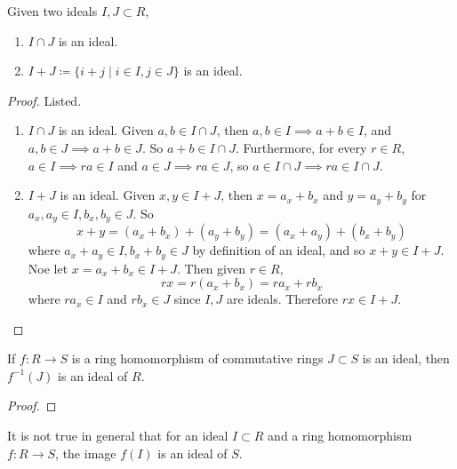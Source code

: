   \begin{theorem} 
    \label{thm:sum_int_ideals}
    Given two ideals $I, J \subset R$, 
    \begin{enumerate}
      \item $I \cap J$ is an ideal. 
      \item $I + J \coloneqq \{i + j \mid i \in I, j \in J\}$ is an ideal. 
    \end{enumerate}
  \end{theorem}
  \begin{proof}
    Listed. 
    \begin{enumerate}
      \item $I \cap J$ is an ideal. Given $a, b \in I \cap J$, then $a, b \in I \implies a + b \in I$, and $a, b \in J \implies a + b \in J$. So $a + b \in I \cap J$. Furthermore, for every $r \in R$, $a \in I \implies r a \in I$ and $a \in J \implies r a \in J$, so $a \in I \cap J \implies ra \in I \cap J$. 

      \item $I + J$ is an ideal. Given $x, y \in I + J$, then $x = a_x + b_x$ and $y = a_y + b_y$ for $a_x, a_y \in I, b_x, b_y \in J$. So 
      \begin{equation}
        x + y = (a_x + b_x) + (a_y + b_y) = (a_x + a_y) + (b_x + b_y)
      \end{equation}
      where $a_x + a_y \in I, b_x + b_y \in J$ by definition of an ideal, and so $x + y \in I + J$. Noe let $x = a_x + b_x \in I + J$. Then given $r \in R$,
      \begin{equation}
        rx = r(a_x + b_x) = r a_x + r b_x
      \end{equation}
      where $r a_x \in I$ and $r b_x \in J$ since $I, J$ are ideals. Therefore $rx \in I + J$.  
    \end{enumerate}
  \end{proof}
  
  \begin{theorem}
    If $f: R \to S$ is a ring homomorphism of commutative rings $J \subset S$ is an ideal, then $f^{-1} (J)$ is an ideal of $R$. 
  \end{theorem}
  \begin{proof}
    
  \end{proof}

  \begin{example}
    It is not true in general that for an ideal $I \subset R$ and a ring homomorphism $f: R \to S$, the image $f(I)$ is an ideal of $S$. 
  \end{example}

